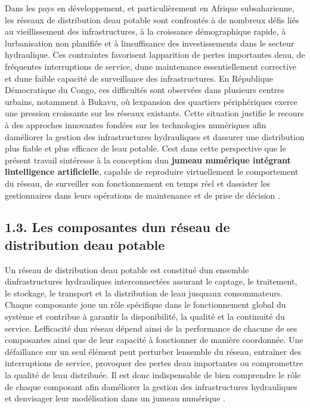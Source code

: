 \documentclass[12pt,a4paper,oneside]{report}
\begin{document}
Dans les pays en développement, et particulièrement en Afrique
subsaharienne, les réseaux de distribution d\textquotesingle eau potable
sont confrontés à de nombreux défis liés au vieillissement des
infrastructures, à la croissance démographique rapide, à
l\textquotesingle urbanisation non planifiée et à
l\textquotesingle insuffisance des investissements dans le secteur
hydraulique. Ces contraintes favorisent l\textquotesingle apparition de
pertes importantes d\textquotesingle eau, de fréquentes interruptions de
service, d\textquotesingle une maintenance essentiellement corrective et
d\textquotesingle une faible capacité de surveillance des
infrastructures. En République Démocratique du Congo, ces difficultés
sont observées dans plusieurs centres urbains, notamment à Bukavu, où
l\textquotesingle expansion des quartiers périphériques exerce une
pression croissante sur les réseaux existants. Cette situation justifie
le recours à des approches innovantes fondées sur les technologies
numériques afin d\textquotesingle améliorer la gestion des
infrastructures hydrauliques et d\textquotesingle assurer une
distribution plus fiable et plus efficace de l\textquotesingle eau
potable. C\textquotesingle est dans cette perspective que le présent
travail s\textquotesingle intéresse à la conception d\textquotesingle un
\textbf{jumeau numérique intégrant l\textquotesingle intelligence
artificielle}, capable de reproduire virtuellement le comportement du
réseau, de surveiller son fonctionnement en temps réel et
d\textquotesingle assister les gestionnaires dans leurs opérations de
maintenance et de prise de décision \cite{ref30}.

\subsection{1.3. Les composantes d\textquotesingle un réseau de
distribution d\textquotesingle eau
potable}\label{les-composantes-dun-ruxe9seau-de-distribution-deau-potable}

Un réseau de distribution d\textquotesingle eau potable est constitué
d\textquotesingle un ensemble d\textquotesingle infrastructures
hydrauliques interconnectées assurant le captage, le traitement, le
stockage, le transport et la distribution de l\textquotesingle eau
jusqu\textquotesingle aux consommateurs. Chaque composante joue un rôle
spécifique dans le fonctionnement global du système et contribue à
garantir la disponibilité, la qualité et la continuité du service.
L\textquotesingle efficacité d\textquotesingle un réseau dépend ainsi de
la performance de chacune de ses composantes ainsi que de leur capacité
à fonctionner de manière coordonnée. Une défaillance sur un seul élément
peut perturber l\textquotesingle ensemble du réseau, entraîner des
interruptions de service, provoquer des pertes d\textquotesingle eau
importantes ou compromettre la qualité de l\textquotesingle eau
distribuée. Il est donc indispensable de bien comprendre le rôle de
chaque composant afin d\textquotesingle améliorer la gestion des
infrastructures hydrauliques et d\textquotesingle envisager leur
modélisation dans un jumeau numérique \cite{ref31}.
\end{document}
